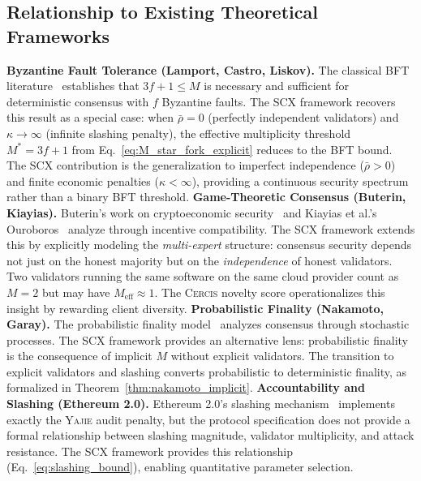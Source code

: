 \documentclass[11pt,a4paper]{article}
\theoremstyle{definition}
\newcommand{\Yajie}{\textsc{Yajie}}
\newcommand{\Cercis}{\textsc{Cercis}}
\newcommand{\SCX}{\textsc{SCX}}
\newcommand{\mthreshold}{M^{*}}
\newcommand{\PoW}{\mathrm{PoW}}
\newcommand{\PoS}{\mathrm{PoS}}
\begin{document}
\subsection{Relationship to Existing Theoretical Frameworks}
\textbf{Byzantine Fault Tolerance (Lamport, Castro, Liskov).} The classical BFT literature~\cite{LamportShostakPease1982,CastroLiskov1999} establishes that $3f + 1 \leq M$ is necessary and sufficient for deterministic consensus with $f$ Byzantine faults. The \SCX{} framework recovers this result as a special case: when $\bar{\rho} = 0$ (perfectly independent validators) and $\kappa \to \infty$ (infinite slashing penalty), the effective multiplicity threshold $\mthreshold = 3f + 1$ from Eq.~\ref{eq:M_star_fork_explicit} reduces to the BFT bound. The \SCX{} contribution is the generalization to imperfect independence ($\bar{\rho} > 0$) and finite economic penalties ($\kappa < \infty$), providing a continuous security spectrum rather than a binary BFT threshold.
\textbf{Game-Theoretic Consensus (Buterin, Kiayias).} Buterin's work on cryptoeconomic security~\cite{Buterin2018} and Kiayias et al.'s Ouroboros~\cite{Kiayias2017} analyze \PoS{} through incentive compatibility. The \SCX{} framework extends this by explicitly modeling the \textit{multi-expert} structure: consensus security depends not just on the honest majority but on the \textit{independence} of honest validators. Two validators running the same software on the same cloud provider count as $M=2$ but may have $M_{\mathrm{eff}} \approx 1$. The \Cercis{} novelty score operationalizes this insight by rewarding client diversity.
\textbf{Probabilistic Finality (Nakamoto, Garay).} The probabilistic finality model~\cite{Nakamoto2008,GarayKiayiasLeonardos2015} analyzes \PoW{} consensus through stochastic processes. The \SCX{} framework provides an alternative lens: probabilistic finality is the consequence of implicit $M$ without explicit validators. The transition to explicit validators and slashing converts probabilistic to deterministic finality, as formalized in Theorem~\ref{thm:nakamoto_implicit}.
\textbf{Accountability and Slashing (Ethereum 2.0).} Ethereum 2.0's slashing mechanism~\cite{Ethereum2023} implements exactly the \Yajie{} audit penalty, but the protocol specification does not provide a formal relationship between slashing magnitude, validator multiplicity, and attack resistance. The \SCX{} framework provides this relationship (Eq.~\ref{eq:slashing_bound}), enabling quantitative parameter selection.
\end{document}
